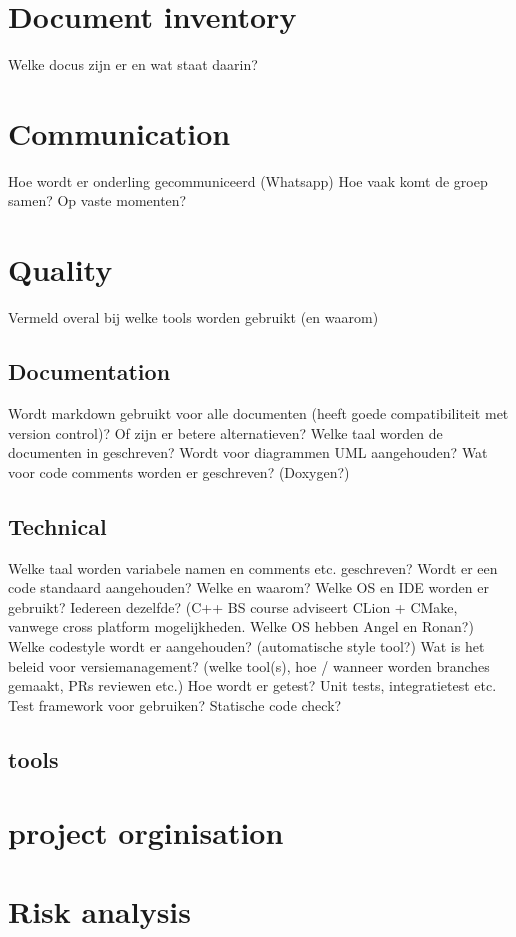 \documentclass{article} %
\begin{document}
    \section{Document inventory}
    Welke docus zijn er en wat staat daarin?
    \newpage

    \section{Communication}
    Hoe wordt er onderling gecommuniceerd (Whatsapp)
    Hoe vaak komt de groep samen? Op vaste momenten?
    \newpage

    \section{Quality}
    Vermeld overal bij welke tools worden gebruikt (en waarom)
    \subsection{Documentation}
    Wordt markdown gebruikt voor alle documenten (heeft goede compatibiliteit met version control)? Of zijn er betere alternatieven?
    Welke taal worden de documenten in geschreven?
    Wordt voor diagrammen UML aangehouden?
    Wat voor code comments worden er geschreven? (Doxygen?)
    \subsection{Technical}
    Welke taal worden variabele namen en comments etc. geschreven?
    Wordt er een code standaard aangehouden? Welke en waarom?
    Welke OS en IDE worden er gebruikt? Iedereen dezelfde? (C++ BS course adviseert CLion + CMake, vanwege cross platform mogelijkheden. Welke OS hebben Angel en Ronan?)
    Welke codestyle wordt er aangehouden? (automatische style tool?)
    Wat is het beleid voor versiemanagement? (welke tool(s), hoe / wanneer worden branches gemaakt, PRs reviewen etc.)
    Hoe wordt er getest? Unit tests, integratietest etc. Test framework voor gebruiken? Statische code check?
    \subsection{tools}
    \newpage

    \section{project orginisation}
    \newpage

    \section{Risk analysis}
    \newpage
\end{document}
